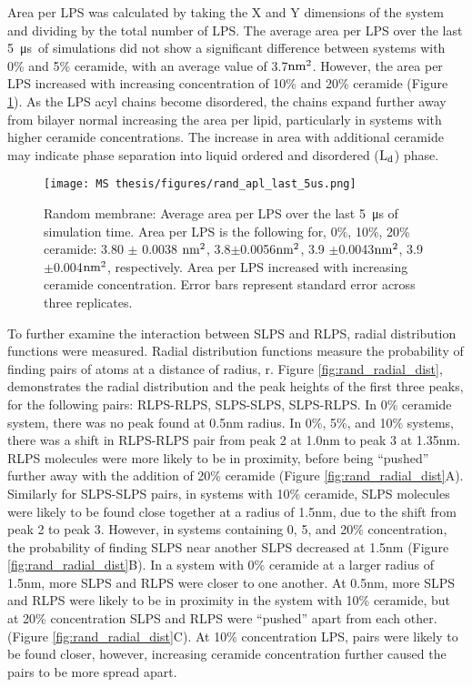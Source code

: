 \documentclass[10pt, letterpaper]{article}
\begin{document}
Area per LPS was calculated by taking the X and Y dimensions of the system and dividing by the total number of LPS. 
The average area per LPS over the last \SI{5}{\micro\second}~of simulations did not show a significant difference between systems with 0\% and 5\% ceramide, with an average value of 3.7$\rm nm^2$. However, the area per LPS increased with increasing concentration of 10\% and 20\% ceramide (Figure \ref{fig:rand_apl}). 
As the LPS acyl chains become disordered, the chains expand further away from bilayer normal increasing the area per lipid, particularly in systems with higher ceramide concentrations. The increase in area with additional ceramide may indicate phase separation into liquid ordered and disordered ($\rm L_d$) phase.

\begin{figure}[H]
  \centerline{\texttt{[image: MS thesis/figures/rand\_apl\_last\_5us.png]}}
  \caption[Random Membrane: Area per LPS]{Random membrane: Average area per LPS over the last \SI{5}{\micro\second} of simulation time. Area per LPS is the following for, 0\%, 10\%, 20\% ceramide:  3.80 $\pm$ 0.0038 $\rm nm^2$, 3.8$\pm$0.0056$\rm nm^2$, 3.9 $\pm$0.0043$\rm nm^2$, 3.9$\pm$0.004$\rm nm^2$, respectively. Area per LPS increased with increasing ceramide concentration. Error bars represent standard error across three replicates. }
  \label{fig:rand_apl}
\end{figure}

To further examine the interaction between SLPS and RLPS, radial distribution functions were measured. Radial distribution functions measure the probability of finding pairs of atoms at a distance of radius, r. Figure \ref{fig:rand_radial_dist}, demonstrates the radial distribution and the peak heights of the first three peaks, for the following pairs: RLPS-RLPS, SLPS-SLPS, SLPS-RLPS. In 0\% ceramide system, there was no peak found at 0.5nm radius. In 0\%, 5\%, and 10\% systems, there was a shift in RLPS-RLPS pair from peak 2 at 1.0nm to peak 3 at 1.35nm. RLPS molecules were more likely to be in proximity, before being \enquote{pushed} further away with the addition of 20\% ceramide (Figure \ref{fig:rand_radial_dist}A). Similarly for SLPS-SLPS pairs, in systems with 10\% ceramide, SLPS molecules were likely to be found close together at a radius of 1.5nm, due to the shift from peak 2 to peak 3. However, in systems containing 0, 5, and 20\%  concentration, the probability of finding SLPS near another SLPS decreased at 1.5nm (Figure \ref{fig:rand_radial_dist}B).
In a system with 0\% ceramide at a larger radius of 1.5nm, more SLPS and RLPS were closer to one another. At 0.5nm, more SLPS and RLPS were likely to be in proximity in the system with 10\% ceramide, but at 20\% concentration SLPS and RLPS were \enquote{pushed} apart from each other. (Figure \ref{fig:rand_radial_dist}C). At 10\% concentration LPS, pairs were likely to be found closer, however, increasing ceramide concentration further caused the pairs to be more spread apart.
\end{document}
